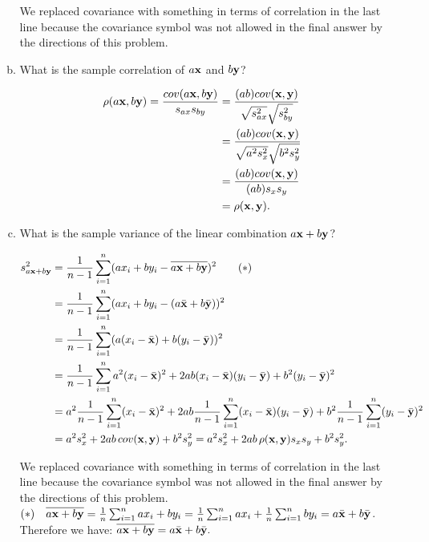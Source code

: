 \documentclass[letterpaper,12pt,fleqn]{article}
\begin{document}
\begin{enumerate}
\begin{enumerate}[a)]
We replaced covariance with something in terms of correlation in the last line because the covariance symbol was not allowed in the final answer by the directions of this problem.

\item What is the sample correlation of $a {\bf x}$ and $b {\bf y}$?

\begin{align*}
\rho(a {\bf x}, b {\bf y}) = \frac{cov(a {\bf x}, b {\bf y})}{s_{ax}s_{by}} &= \frac{(ab)cov({\bf x}, {\bf y})}{\sqrt{s_{ax}^2}\sqrt{s_{by}^2}} \\
&= \frac{(ab)cov({\bf x}, {\bf y})}{\sqrt{a^2s_{x}^2}\sqrt{b^2s_{y}^2}} \\
&= \frac{(ab)cov({\bf x}, {\bf y})}{(ab)s_xs_y} \\
&= \rho({\bf x},{\bf y}).
\end{align*}

\item What is the sample variance of the linear combination $a {\bf x} + b {\bf y}$?

\begin{align*}
s_{a {\bf x} + b {\bf y}}^2 &= \frac{1}{n-1} \sum_{i=1}^{n} (ax_i+by_i - \overline{a {\bf x} + b {\bf y}})^2 \quad\quad (*)\\
&= \frac{1}{n-1} \sum_{i=1}^{n} (ax_i + by_i - (a\bar{{\bf x}} + b \bar{{\bf y}}))^2 \\
&= \frac{1}{n-1} \sum_{i=1}^{n} (a(x_i - \bar{{\bf x}}) + b(y_i - \bar{{\bf y}}))^2 \\
&= \frac{1}{n-1} \sum_{i=1}^{n} a^2(x_i - \bar{{\bf x}})^2 + 2ab(x_i - \bar{{\bf x}})(y_i - \bar{{\bf y}}) + b^2(y_i - \bar{{\bf y}})^2 \\
&= a^2\frac{1}{n-1} \sum_{i=1}^{n} (x_i - \bar{{\bf x}})^2+ 2ab\frac{1}{n-1} \sum_{i=1}^{n}(x_i - \bar{{\bf x}})(y_i - \bar{{\bf y}}) + b^2\frac{1}{n-1} \sum_{i=1}^{n} (y_i - \bar{{\bf y}})^2 \\
&= a^2s_x^2 + 2ab\,cov({\bf x}, {\bf y}) + b^2s_y^2 = a^2s_x^2 + 2ab\,\rho(\textbf{x},\textbf{y})s_xs_y+ b^2s_y^2.
\end{align*}

We replaced covariance with something in terms of correlation in the last line because the covariance symbol was not allowed in the final answer by the directions of this problem. \\

$(*) \quad \overline{a {\bf x} + b {\bf y}} = \frac{1}{n}\sum_{i=1}^{n} ax_i + by_i = \frac{1}{n} \sum_{i=1}^{n} ax_i + \frac{1}{n} \sum_{i=1}^{n} by_i = a\bar{{\bf x}} + b\bar{\bf y}$. Therefore we have: $\overline{a {\bf x} + b {\bf y}} =a\bar{{\bf x}} + b\bar{\bf y}.$
\end{enumerate}



\end{enumerate}
\end{document}
